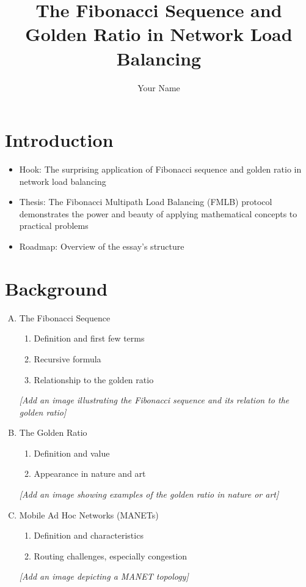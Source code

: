 \documentclass{article}
\begin{document}
\title{The Fibonacci Sequence and Golden Ratio in Network Load Balancing}
\author{Your Name}
\date{}
\maketitle

\section{Introduction}
\begin{itemize}
    \item Hook: The surprising application of Fibonacci sequence and golden ratio in network load balancing
    \item Thesis: The Fibonacci Multipath Load Balancing (FMLB) protocol demonstrates the power and beauty of applying mathematical concepts to practical problems
    \item Roadmap: Overview of the essay's structure
\end{itemize}

\section{Background}
\begin{enumerate}[A.]
    \item The Fibonacci Sequence
    \begin{enumerate}
        \item Definition and first few terms
        \item Recursive formula
        \item Relationship to the golden ratio
    \end{enumerate}
    \textit{[Add an image illustrating the Fibonacci sequence and its relation to the golden ratio]}
    \item The Golden Ratio
    \begin{enumerate}
        \item Definition and value
        \item Appearance in nature and art
    \end{enumerate}
    \textit{[Add an image showing examples of the golden ratio in nature or art]}
    \item Mobile Ad Hoc Networks (MANETs)
    \begin{enumerate}
        \item Definition and characteristics
        \item Routing challenges, especially congestion
    \end{enumerate}
    \textit{[Add an image depicting a MANET topology]}
\end{enumerate}
\end{document}
